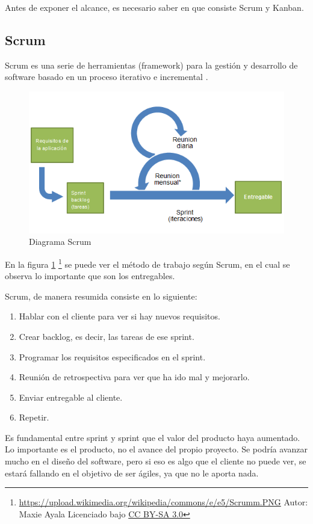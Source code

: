 Antes de exponer el alcance, es necesario saber en que consiste Scrum y Kanban.

\subsection{Scrum}
Scrum es una serie de herramientas (framework) para la gesti\'on y desarrollo de software basado en un proceso iterativo e incremental 
\cite{Scrum:WhatIsIt}.

\begin{figure}[H]
	\includegraphics[width=0.7\linewidth]{./Figures/Scrumm.PNG}
	\caption[Proceso iterativo Scrum]{Diagrama Scrum}
	\label{fig:Scrum}
\end{figure}

En la figura \ref{fig:Scrum} \footnote{\url{https://upload.wikimedia.org/wikipedia/commons/e/e5/Scrumm.PNG} Autor: Maxie Ayala 
	Licenciado bajo \hyperlink{creativecommons.org/licenses/by-sa/3.0/}{CC BY-SA 3.0}} 
se puede ver el método de trabajo seg\'un Scrum, en el cual se observa lo importante que son los entregables.

Scrum, de manera resumida consiste en lo siguiente:
\begin{enumerate}
	\item Hablar con el cliente para ver si hay nuevos requisitos.
	\item Crear backlog, es decir, las tareas de ese sprint.
	\item Programar los requisitos especificados en el sprint.
	\item Reunión de retrospectiva para ver que ha ido mal y mejorarlo.
	\item Enviar entregable al cliente.
	\item Repetir.
\end{enumerate}

Es fundamental entre sprint y sprint que el valor del producto haya aumentado. Lo importante es el producto, no el 
avance del propio proyecto. Se podr\'ia avanzar mucho en el dise\~no del software, pero si eso es algo que el cliente no 
puede ver, se estar\'a fallando en el objetivo de ser \'agiles, ya que no le aporta nada.

